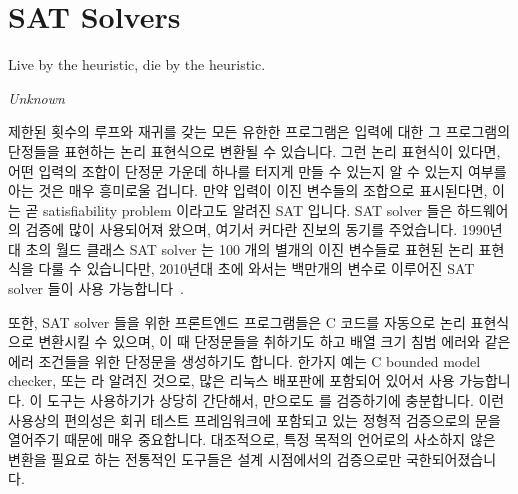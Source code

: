 
\section{SAT Solvers}
\label{sec:formal:SAT Solvers}
%
\epigraph{Live by the heuristic, die by the heuristic.}{\emph{Unknown}}

제한된 횟수의 루프와 재귀를 갖는 모든 유한한 프로그램은 입력에 대한 그
프로그램의 단정들을 표현하는 논리 표현식으로 변환될 수 있습니다.
그런 논리 표현식이 있다면, 어떤 입력의 조합이 단정문 가운데 하나를 터지게 만들
수 있는지 알 수 있는지 여부를 아는 것은 매우 흥미로울 겁니다.
만약 입력이 이진 변수들의 조합으로 표시된다면, 이는 곧 satisfiability problem
이라고도 알려진 SAT 입니다.
SAT solver 들은 하드웨어의 검증에 많이 사용되어져 왔으며, 여기서 커다란 진보의
동기를 주었습니다.
1990년대 초의 월드 클래스 SAT solver 는 100 개의 별개의 이진 변수들로 표현된
논리 표현식을 다룰 수 있습니다만, 2010년대 초에 와서는 백만개의 변수로 이루어진
SAT solver 들이 사용 가능합니다~\cite{Kroening:2008:DPA:1391237}.

또한, SAT solver 들을 위한 프론트엔드 프로그램들은 C 코드를 자동으로 논리
표현식으로 변환시킬 수 있으며, 이 때 단정문들을 취하기도 하고 배열 크기 침범
에러와 같은 에러 조건들을 위한 단정문을 생성하기도 합니다.
한가지 예는 C bounded model checker, 또는  라 알려진 것으로, 많은
리눅스 배포판에 포함되어 있어서 사용 가능합니다.
이 도구는 사용하기가 상당히 간단해서,  만으로도 
를 검증하기에 충분합니다.
이런 사용상의 편의성은 회귀 테스트 프레임워크에 포함되고 있는 정형적 검증으로의
문을 열어주기 때문에 매우 중요합니다.
대조적으로, 특정 목적의 언어로의 사소하지 않은 변환을 필요로 하는 전통적인
도구들은 설계 시점에서의 검증으로만 국한되어졌습니다.
\iffalse

